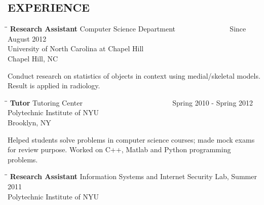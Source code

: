 \documentclass{res}
\begin{document}
\begin{resume}
\section{EXPERIENCE}
   \vspace{-0.05in}	
   \begin{tabbing}
   \hspace{2.3in}\= \hspace{2.6in}\= \kill %
    {\bf Research Assistant} \>Computer Science Department ~~~~~~~~~~~~~~  Since August 2012\\
    \> University of North Carolina at Chapel Hill  \\
                          \>Chapel Hill, NC
   \end{tabbing}\vspace{-20pt}
    Conduct research on statistics of objects in context using medial/skeletal models. Result is applied in radiology. 
   \vspace{-0.1in}	
   \begin{tabbing}
   \hspace{2.3in}\= \hspace{2.6in}\= \kill %
    {\bf Tutor} \>Tutoring Center ~~~~~~~~~~~~~~~~~~~~~~~~ Spring 2010 - Spring 2012\\
    \> Polytechnic Institute of NYU\\
                          \>Brooklyn, NY
   \end{tabbing}\vspace{-20pt}
    Helped students solve problems in computer science courses; made mock exams for review purpose. Worked on C++, Matlab and Python programming problems.
       \begin{tabbing}
   \hspace{2.3in}\= \hspace{2.6in}\= \kill %
    {\bf Research Assistant} \> Information Systems and Internet Security Lab, Summer 2011 \\
    \>Polytechnic Institute of NYU  \\


\end{tabbing}
\end{resume}
\end{document}
